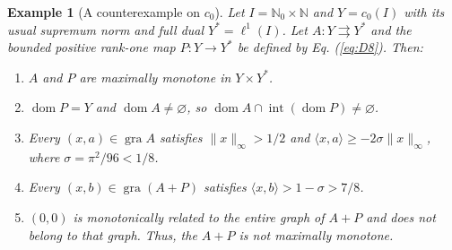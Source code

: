 \documentclass[11pt]{article}
\newcommand{\N}{\mathbb N}
\newcommand{\Nzero}{\mathbb N_0}
\newcommand{\gra}{\operatorname{gra}}
\newcommand{\dom}{\operatorname{dom}}
\newcommand{\pair}[2]{\langle #1,#2\rangle}
\newtheorem{example}{Example}
\theoremstyle{definition}
\theoremstyle{remark}
\begin{document}
\label{sec:c0}
\label{sec:statements}
\begin{example}[A counterexample on $c_0$]\label{thm:C}
Let $I=\Nzero\times\N$ and $Y=c_0(I)$ with its usual supremum norm and full dual $Y^*=\ell^1(I)$. Let $A:Y\rightrightarrows Y^*$ and the bounded positive rank-one map $P:Y\to Y^*$ be defined by Eq. (\ref{eq:D8}). Then:
\begin{enumerate}
\item $A$ and $P$ are maximally monotone in $Y\times Y^*$.
\item $\dom P=Y$ and $\dom A\ne\varnothing$, so
$\dom A\cap\operatorname{int}(\dom P)\ne\varnothing$.
\item Every $(x,a)\in\gra A$ satisfies $\|x\|_\infty>1/2$ and
$\pair{x}{a}\ge-2\sigma\|x\|_\infty$, where $\sigma=\pi^2/96<1/8$.
\item Every $(x,b)\in\gra(A+P)$ satisfies
$\pair{x}{b}>1-\sigma>7/8$.
\item $(0,0)$ is monotonically related to the entire graph of $A+P$ and
does not belong to that graph. Thus, the $A+P$ is not maximally monotone.
\end{enumerate}
\end{example}
\end{document}
